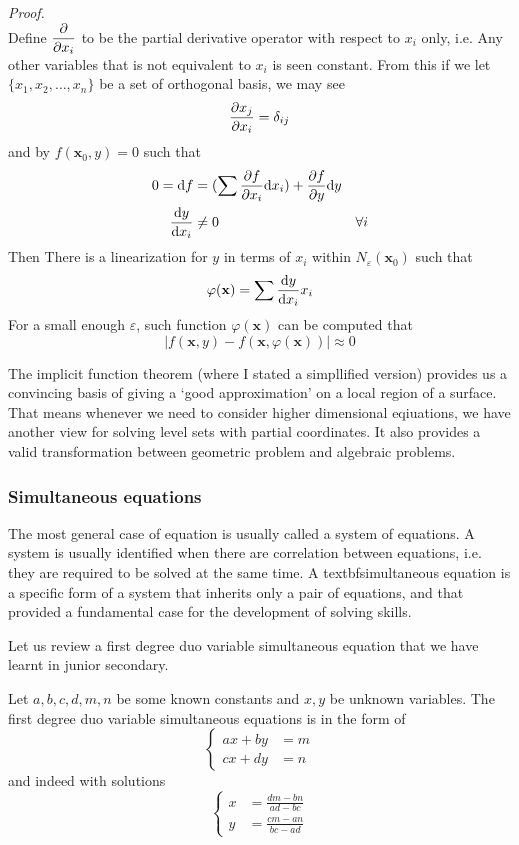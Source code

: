 \documentclass[12pt]{article}
\renewenvironment{proof}[1][Proof]{\begin{snugshade*} \textit{{#1}.}\\}{\hfill \qedsymbol \end{snugshade*}}
\begin{document}
    \begin{proof}
        Define $\displaystyle \partialderivative{x_i}$ to be the partial derivative operator with respect to $x_i$ only, i.e. Any other variables that is not equivalent to $x_i$ is seen constant. From this if we let $\{x_1,x_2,\dots,x_n\}$ be a set of orthogonal basis, we may see \begin{align*}
            \partialderivative{x_j}{x_i}=\delta_{ij}
        \end{align*} and by $f(\mathbf{x}_0,y)=0$ such that \begin{align*}
            0=\mathrm{d}f&=(\sum \partialderivative{f}{x_i}\mathrm{d}x_i) + \partialderivative{f}{y}\mathrm{d}y\\
            \derivative{y}{x_i}&\neq 0&\forall i
        \end{align*}
        Then There is a linearization for $y$ in terms of $x_i$ within $N_{\varepsilon}(\mathbf{x}_0)$ such that \[\varphi(\mathbf{x})=\sum \derivative{y}{x_i}x_i\]
        For a small enough $\varepsilon$, such function $\varphi(\mathbf{x})$ can be computed that \[|f(\mathbf{x},y)-f(\mathbf{x},\varphi(\mathbf{x}))|\approx 0\]
    \end{proof}

    The implicit function theorem (where I stated a simpllified version) provides us a convincing basis of giving a `good approximation' on a local region of a surface. That means whenever we need to consider higher dimensional eqiuations, we have another view for solving level sets with partial coordinates. It also provides a valid transformation between geometric problem and algebraic problems.

    \subsubsection*{Simultaneous equations}

    The most general case of equation is usually called a system of equations. A system is usually identified when there are correlation between equations, i.e. they are required to be solved at the same time. A textbf{simultaneous equation} is a specific form of a system that inherits only a pair of equations, and that provided a fundamental case for the development of solving skills.

    Let us review a first degree duo variable simultaneous equation that we have learnt in junior secondary.

    Let $a,b,c,d,m,n$ be some known constants and $x,y$ be unknown variables. The first degree duo variable simultaneous equations is in the form of \[\begin{cases}
        ax+by&=m\\
        cx+dy&=n
    \end{cases}\]
    and indeed with solutions \[\begin{cases}
        x&=\displaystyle \frac{dm-bn}{ad-bc}\\
        y&=\displaystyle \frac{cm-an}{bc-ad}
    \end{cases}\]
\end{document}
